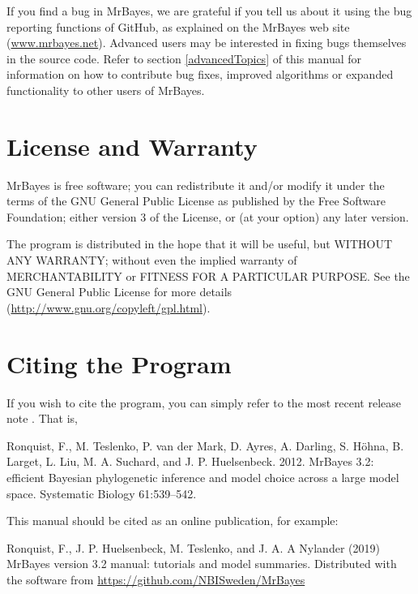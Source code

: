 \documentclass[12pt]{book}
\begin{document}
If you find a bug in MrBayes, we are grateful if you tell us about it using the bug reporting
functions of GitHub, as explained on the MrBayes web site (\url{www.mrbayes.net}).
Advanced users may be interested in fixing bugs themselves in the source code. Refer to section
\ref{advancedTopics} of this manual for information on how to contribute bug fixes, improved
algorithms or expanded functionality to other users of MrBayes.

\section{License and Warranty}

MrBayes is free software; you can redistribute it and/or modify it under the terms of the GNU
General Public License as published by the Free Software Foundation; either version 3 of the
License, or (at your option) any later version.

The program is distributed in the hope that it will be useful, but WITHOUT ANY WARRANTY; without
even the implied warranty of MERCHANTABILITY or FITNESS FOR A PARTICULAR PURPOSE. See the GNU
General Public License for more details (\url{http://www.gnu.org/copyleft/gpl.html}).

\section{Citing the Program}

If you wish to cite the program, you can simply refer to the most recent release note
\citep{ronquist12b}. That is,

\begin{singlespacing}
\footnotesize
Ronquist, F., M. Teslenko, P. van der Mark, D. Ayres, A. Darling, S. H\"{o}hna,
B. Larget, L. Liu, M. A. Suchard, and J. P. Huelsenbeck. 2012. MrBayes 3.2:
efficient Bayesian phylogenetic inference and model choice across a large model
space. Systematic Biology 61:539--542.
\normalsize
\end{singlespacing}

This manual should be cited as an online publication, for example:

\begin{singlespacing}
\footnotesize
Ronquist, F., J. P. Huelsenbeck, M. Teslenko, and J. A. A Nylander (2019) MrBayes version 3.2 manual:
tutorials and model summaries. Distributed with the software from
\url{https://github.com/NBISweden/MrBayes}
\normalsize
\end{singlespacing}
\end{document}
